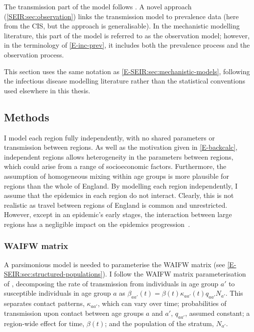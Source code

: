\documentclass[thesis.tex]{subfiles}
\begin{document}
The transmission part of the model follows \textcite{birrellRealtime}.
A novel approach (\cref{SEIR:sec:observation}) links the transmission model to prevalence data (here from the CIS, but the approach is generalisable).
In the mechanistic modelling literature, this part of the model is referred to as the observation model; however, in the terminology of \cref{E-inc-prev}, it includes both the prevalence process and the observation process.

This section uses the same notation as \cref{E-SEIR:sec:mechanistic-models}, following the infectious disease modelling literature rather than the statistical conventions used elsewhere in this thesis.

\subsection{Methods}


I model each region fully independently, \ie with no shared parameters or transmission between regions.
As well as the motivation given in \cref{E-backcalc}, independent regions allows heterogeneity in the parameters between regions, which could arise from a range of socioeconomic factors.
Furthermore, the assumption of homogeneous mixing within age groups is more plausible for regions than the whole of England.
By modelling each region independently, I assume that the epidemics in each region do not interact.
Clearly, this is not realistic as travel between regions of England is common and unrestricted.
However, except in an epidemic's early stages, the interaction between large regions has a negligible impact on the epidemics progression~\autocite[e.g.][]{birrellRealtimea,gogSpatial,eggoSpatial}.

\subsubsection{WAIFW matrix}

A parsimonious model is needed to parameterise the WAIFW matrix (see \cref{E-SEIR:sec:structured-populations}).
I follow the WAIFW matrix parameterisation of \textcite{birrellRealtime}, decomposing the rate of transmission from individuals in age group $a'$ to susceptible individuals in age group $a$ as $\beta_{aa'}(t) = \beta(t) \kappa_{aa'}(t) q_{aa'} N_{a'}$.
This separates contact patterns, $\kappa_{aa'}$, which can vary over time; probabilities of transmission upon contact between age groups $a$ and $a'$, $q_{aa'}$, assumed constant; a region-wide effect for time, $\beta(t)$; and the population of the stratum, $N_{a'}$.
\end{document}
